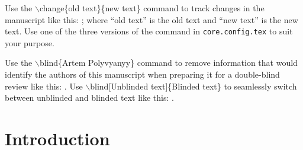 %
\def\mode{lncs}







\usepackage{subfig}
\usepackage{txfonts} %
\usepackage{lipsum}
\usepackage{adjustbox}





Use the {$\backslash$change\{old text\}\{new text\}} command to track changes in the manuscript like this: ; where ``old text'' is the old text and ``new text'' is the new text.
Use one of the three versions of the command in \texttt{core.config.tex} to suit your purpose.

Use the {$\backslash$blind\{Artem Polyvyanyy\}} command to remove information that would identify the authors of this manuscript when preparing it for a double-blind review like this: .
Use {$\backslash$blind[Unblinded text]\{Blinded text\}} to seamlessly switch between unblinded and blinded text like this:
.


\section{Introduction}
\label{sec:introduction}

